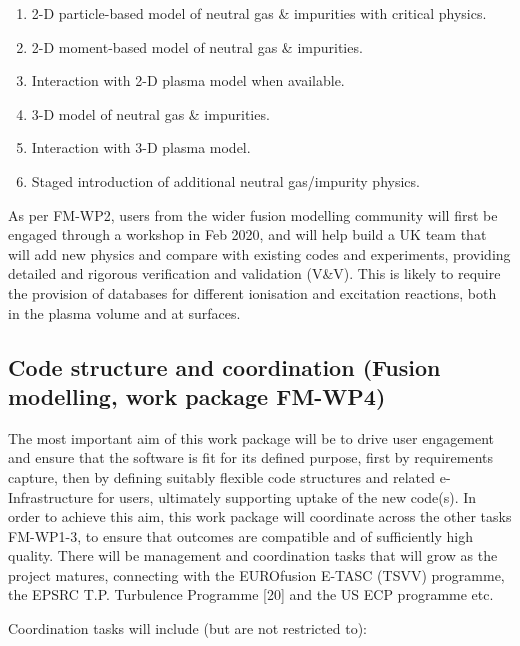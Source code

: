 \begin{enumerate}
\item 2-D particle-based model of neutral gas \& impurities with critical physics.

\item 2-D moment-based model of neutral gas \& impurities.

\item Interaction with 2-D plasma model when available.

\item 3-D model of neutral gas \& impurities.

\item Interaction with 3-D plasma model.

\item Staged introduction of additional neutral gas/impurity physics.
\end{enumerate}

As per FM-WP2, users from the wider fusion modelling community will first be engaged 
through a workshop in Feb 2020, and will help build a UK team that will add new 
physics and compare with existing codes and experiments, providing detailed and 
rigorous verification and validation (V\&V). This is likely to require the provision 
of databases for different ionisation and excitation reactions, both in the plasma 
volume and at surfaces.

\subsection*{\textbf{Code structure and coordination} (Fusion modelling, work package \textbf{FM-WP4})}

The most important aim of this work package will be to drive user engagement and 
ensure that the software is fit for its defined purpose, first by requirements 
capture, then by defining suitably flexible code structures and related e-Infrastructure 
for users, ultimately supporting uptake of the new code(s). In order to achieve 
this aim, this work package will coordinate across the other tasks FM-WP1-3, to 
ensure that outcomes are compatible and of sufficiently high quality. There will 
be management and coordination tasks that will grow as the project matures, connecting 
with the EUROfusion E-TASC (TSVV) programme, the EPSRC T.P. Turbulence Programme 
[20] and the US ECP programme etc.

Coordination tasks will include (but are not restricted to):

